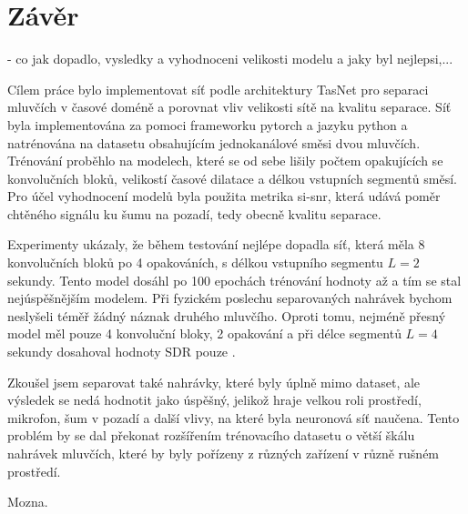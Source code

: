 \chapter{Závěr}
\label{zaver}
- co jak dopadlo, vysledky a vyhodnoceni velikosti modelu a jaky byl nejlepsi,...

Cílem práce bylo implementovat síť podle architektury TasNet pro separaci mluvčích v časové doméně a porovnat vliv velikosti sítě na kvalitu separace. Síť byla implementována za pomoci frameworku pytorch a jazyku python a natrénována na datasetu obsahujícím jednokanálové směsi dvou mluvčích. Trénování proběhlo na  modelech, které se od sebe lišily počtem opakujících se konvolučních bloků, velikostí časové dilatace a délkou vstupních segmentů směsí. Pro účel vyhodnocení modelů byla použita metrika si-snr, která udává poměr chtěného signálu ku šumu na pozadí, tedy obecně kvalitu separace. 

Experimenty ukázaly, že během testování nejlépe dopadla síť, která měla 8 konvolučních bloků po 4 opakováních, s délkou vstupního segmentu $L=2$ sekundy. Tento model dosáhl po 100 epochách trénování hodnoty až  a tím se stal nejúspěšnějším modelem. Při fyzickém poslechu separovaných nahrávek bychom neslyšeli téměř žádný náznak druhého mluvčího. Oproti tomu, nejméně přesný model měl pouze 4 konvoluční bloky, 2 opakování a při délce segmentů $L=4$ sekundy dosahoval hodnoty SDR pouze .

Zkoušel jsem separovat také nahrávky, které byly úplně mimo dataset, ale výsledek se nedá hodnotit jako úspěšný, jelikož hraje velkou roli prostředí, mikrofon, šum v pozadí a další vlivy, na které byla neuronová síť naučena. Tento problém by se dal překonat rozšířením trénovacího datasetu o větší škálu nahrávek mluvčích, které by byly pořízeny z různých zařízení v různě rušném prostředí.


Mozna.



